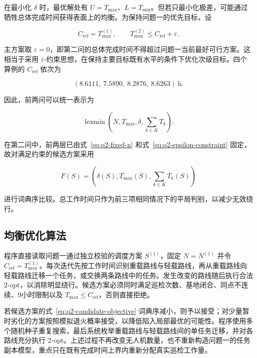 \documentclass[UTF8,a4paper,12pt]{ctexart}
\numberwithin{equation}{section}
\numberwithin{equation}{section}
\begin{document}
在最小化 \(\delta\) 时，最优解处有 \(U=T_{\max}\)、\(L=T_{\min}\)。但若只最小化极差，可能通过牺牲总体完成时间获得表面上的均衡。为保持问题一的优先目标，设

\begin{equation}
  C_{\mathrm{ref}}=T_{\max}^{(1)},
  \qquad
  T_{\max}^{(2)}\leq C_{\mathrm{ref}}+\varepsilon.
  \label{eq:q2-epsilon-constraint}
\end{equation}

主方案取 \(\varepsilon=0\)，即第二问的总体完成时间不得超过问题一当前最好可行方案。这相当于采用 \(\varepsilon\)-约束思想，在保持主要目标既有水平的条件下优化次级目标\cite{mavrotas2009}。四个算例的 \(C_{\mathrm{ref}}\) 依次为

\[
  (8.6111,\ 7.5890,\ 8.2876,\ 8.6263)\ \mathrm{h}.
\]

因此，前两问可以统一表示为

\begin{equation}
  \operatorname{lexmin}
  \left(
    N,T_{\max},\delta,\sum_{k\in K}T_k
  \right).
  \label{eq:q2-overall-objective}
\end{equation}

在第二问中，前两层已由式~\eqref{eq:q2-fixed-n} 和式~\eqref{eq:q2-epsilon-constraint} 固定，故对满足约束的候选方案采用

\begin{equation}
  F(S)=
  \left(
    \delta(S),T_{\max}(S),\sum_{k\in K}T_k(S)
  \right)
  \label{eq:q2-candidate-objective}
\end{equation}

进行词典序比较。总工作时间只作为前三项相同情况下的平局判别，以减少无效绕行。

\subsection{均衡优化算法}

程序直接读取问题一通过独立校验的调度方案 \(S^{(1)}\)，固定 \(N=N^{(1)}\) 并令 \(C_{\mathrm{ref}}=T_{\max}^{(1)}\)。每次迭代先按工作时间识别重载路线与轻载路线，再从重载路线向轻载路线迁移一个任务，或交换两条路线中的任务。发生改变的路线随后执行合法 2-opt，以消除明显绕行。候选方案必须同时满足巡检次数、基地闭合、同点不连续、9小时限制以及 \(T_{\max}\leq C_{\mathrm{ref}}\)，否则直接拒绝。

若候选方案的式~\eqref{eq:q2-candidate-objective} 词典序减小，则予以接受；对少量暂时劣化的方案按照模拟退火概率接受，以降低陷入局部最优的可能性。程序使用多个随机种子重复搜索，最后系统枚举重载路线与轻载路线间的单任务迁移，并对各路线充分执行 2-opt。上述过程不再改变无人机数量，也不重新构造问题一的任务副本模型，重点只在既有完成时间上界内重新分配真实巡检工作量。
\end{document}

